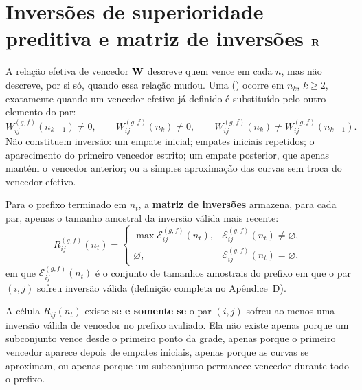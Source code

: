 \section{Inversões de superioridade preditiva e matriz de inversões \texorpdfstring{$\mathbf{R}$}{R}}
\label{sec:reversal-matrix}

A relação efetiva de vencedor $\mathbf{W}$ descreve quem vence em cada $n$, mas não descreve, por si só, quando essa relação mudou. Uma \textbf{\PairwiseSuperiorityReversal{}} (\WinnerReversal{}) ocorre em $n_k$, $k\geq2$, exatamente quando um vencedor efetivo já definido é substituído pelo outro elemento do par:
\begin{equation}
  W^{(g,f)}_{ij}(n_{k-1})\neq0,\qquad
  W^{(g,f)}_{ij}(n_k)\neq0,\qquad
  W^{(g,f)}_{ij}(n_k)\neq W^{(g,f)}_{ij}(n_{k-1}).
  \label{eq:valid-reversal}
\end{equation}
Não constituem inversão: um empate inicial; empates iniciais repetidos; o aparecimento do primeiro vencedor estrito; um empate posterior, que apenas mantém o vencedor anterior; ou a simples aproximação das curvas sem troca do vencedor efetivo.

Para o prefixo terminado em $n_t$, a \textbf{matriz de inversões} armazena, para cada par, apenas o tamanho amostral da inversão válida mais recente:
\begin{equation}
  R^{(g,f)}_{ij}(n_t)=
  \begin{cases}
    \max\mathcal{E}^{(g,f)}_{ij}(n_t), & \mathcal{E}^{(g,f)}_{ij}(n_t)\neq\varnothing,\\
    \varnothing, & \mathcal{E}^{(g,f)}_{ij}(n_t)=\varnothing,
  \end{cases}
  \label{eq:reversal-matrix}
\end{equation}
em que $\mathcal{E}^{(g,f)}_{ij}(n_t)$ é o conjunto de tamanhos amostrais do prefixo em que o par $(i,j)$ sofreu inversão válida (definição completa no Apêndice~D).

\begin{definitionbox}
A célula $R_{ij}(n_t)$ existe \textbf{se e somente se} o par $(i,j)$ sofreu ao menos uma inversão válida de vencedor no prefixo avaliado. Ela não existe apenas porque um subconjunto vence desde o primeiro ponto da grade, apenas porque o primeiro vencedor aparece depois de empates iniciais, apenas porque as curvas se aproximam, ou apenas porque um subconjunto permanece vencedor durante todo o prefixo.
\end{definitionbox}

